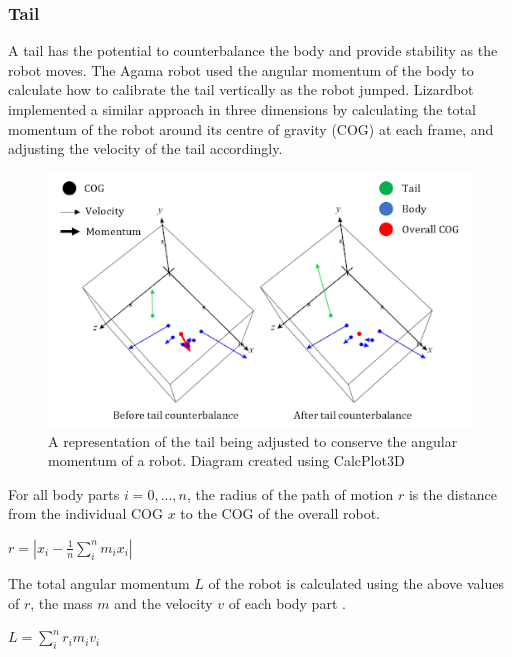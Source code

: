 \documentclass{article}
\begin{document}
\newpage
\subsubsection{Tail}
\label{sec:Tail Imp}
A tail has the potential to counterbalance the body and provide stability as the robot moves. The Agama robot used the angular momentum of the body to calculate how to calibrate the tail vertically as the robot jumped. Lizardbot implemented a similar approach in three dimensions by calculating the total momentum of the robot around its centre of gravity (COG) at each frame, and adjusting the velocity of the tail accordingly.\\ 
\begin{figure}[H]
\centering
\includegraphics[scale=0.6]{tailMomentum}
\caption{A representation of the tail being adjusted to conserve the angular momentum of a robot. Diagram created using CalcPlot3D \citep{diagrams}}
\end{figure}

For all body parts $i = 0, ..., n$, the radius of the path of motion $r$ is the distance from the individual COG $x$ to the COG of the overall robot.
\begin{center}
\begin{Large}
$r = |x_{i} - \frac{1}{n}\sum_{i}^{n}m_{i}x_{i}|$
\end{Large}
\end{center}

The total angular momentum $L$ of the robot is calculated using the above values of $r$, the mass $m$ and the velocity $v$ of each body part .
\begin{center}
\begin{Large}
$L = \sum^{n}_{i} r_{i}m_{i}v_{i}$
\end{Large}
\end{center}
\end{document}
